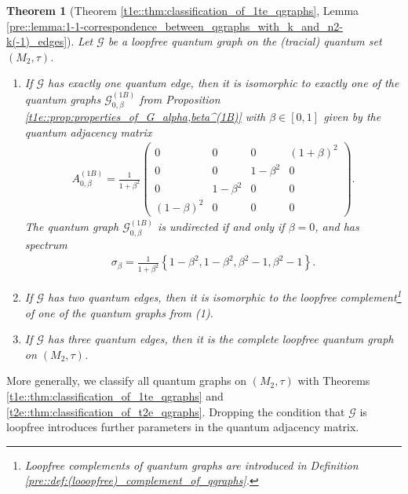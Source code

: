 \documentclass{amsart}
\newtheorem{thm}{Theorem}[section]
\begin{document}
\begin{thm}[Theorem \ref{t1e::thm:classification_of_1te_qgraphs}, Lemma \ref{pre::lemma:1-1-correspondence_between_qgraphs_with_k_and_n2-k(-1)_edges}]
    Let $\mathcal{G}$ be a loopfree quantum graph on the (tracial) quantum set $(M_2, \tau)$.
    \begin{enumerate}
        \item If $\mathcal{G}$ has exactly one quantum edge, then it is isomorphic to exactly one of the quantum graphs $\mathcal{G}_{0,\beta}^{(1B)}$ from Proposition \ref{t1e::prop:properties_of_G_alpha,beta^(1B)} with $\beta \in [0,1]$ given by the quantum adjacency matrix 
        \begin{align*}
            A_{0,\beta}^{(1B)}=
        \frac{1}{1+\beta^2}
        \begin{pmatrix}
            0 & 0 & 0 & (1+\beta)^2 \\
            0 & 0 & 1 - \beta^2 & 0 \\
            0 & 1-\beta^2 & 0 & 0 \\
            (1-\beta)^2 & 0 & 0 & 0
        \end{pmatrix}.
        \end{align*}
        The quantum graph $\mathcal{G}_{0,\beta}^{(1B)}$ is undirected if and only if $\beta = 0$, and has spectrum
        \begin{align*}
            \sigma_\beta =\frac{1}{1+\beta^2} \left\{1-\beta^2, 1-\beta^2, \beta^2-1, \beta^2-1\right\}.
        \end{align*}
        \item If $\mathcal{G}$ has two quantum edges, then it is isomorphic to the loopfree complement\footnote{Loopfree complements of quantum graphs are introduced in Definition \ref{pre::def:(looopfree)_complement_of_qgraphs}.} of one of the quantum graphs from (1).
        \item If $\mathcal{G}$ has three quantum edges, then it is the complete loopfree quantum graph on $(M_2, \tau)$.
    \end{enumerate}
\end{thm}



More generally, we classify all quantum graphs on $(M_2, \tau)$ with Theorems \ref{t1e::thm:classification_of_1te_qgraphs} and \ref{t2e::thm:classification_of_t2e_qgraphs}. Dropping the condition that $\mathcal{G}$ is loopfree introduces further parameters in the quantum adjacency matrix.
\end{document}
